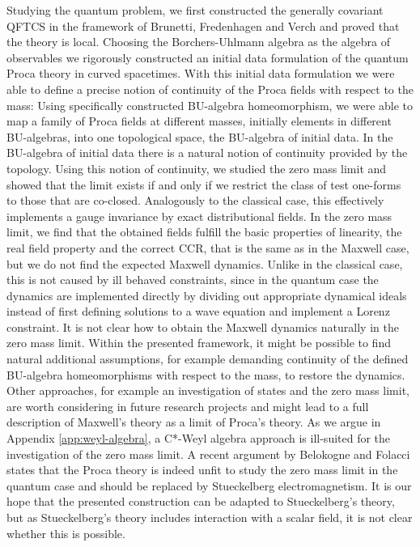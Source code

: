 Studying the quantum problem, we first constructed the generally covariant QFTCS in the framework of Brunetti, Fredenhagen and Verch and proved that the theory is local. Choosing the Borchers-Uhlmann algebra as the algebra of observables we rigorously constructed an initial data formulation of the quantum Proca theory in curved spacetimes. With this initial data formulation we were able to define a precise notion of continuity of the Proca fields with respect to the mass: Using specifically constructed BU-algebra homeomorphism, we were able to map a family of Proca fields at different masses, initially elements in different BU-algebras, into one topological space, the BU-algebra of initial data. In the BU-algebra of initial data there is a natural notion of continuity provided by the topology. Using this notion of continuity, we studied the zero mass limit and showed that the limit exists if and only if we restrict the class of test one-forms to those that are co-closed. Analogously to the classical case, this effectively implements a gauge invariance by exact distributional fields. In the zero mass limit, we find that the obtained fields fulfill the basic properties of linearity, the real field property and the correct CCR, that is the same as in the Maxwell case, but we do not find the expected Maxwell dynamics. Unlike in the classical case, this is not caused by ill behaved constraints, since in the quantum case the dynamics are implemented directly by dividing out appropriate dynamical ideals instead of first defining solutions to a wave equation and implement a Lorenz constraint. It is not clear how to obtain the Maxwell dynamics naturally in the zero mass limit. Within the presented framework, it might be possible to find natural additional assumptions, for example demanding continuity of the defined BU-algebra homeomorphisms with respect to the mass, to restore the dynamics. Other approaches, for example an investigation of states and the zero mass limit, are worth considering in future research projects and might lead to a full description of Maxwell's theory as a limit of Proca's theory. As we argue in Appendix \ref{app:weyl-algebra}, a C*-Weyl algebra approach is ill-suited for the investigation of the zero mass limit. A recent argument by Belokogne and Folacci \cite{stueckelberg_curvedST} states that the Proca theory is indeed unfit to study the zero mass limit in the quantum case and should be replaced by Stueckelberg electromagnetism. It is our hope that the presented construction can be adapted to Stueckelberg's theory, but as Stueckelberg's theory includes interaction with a scalar field, it is not clear whether this is possible. \par
